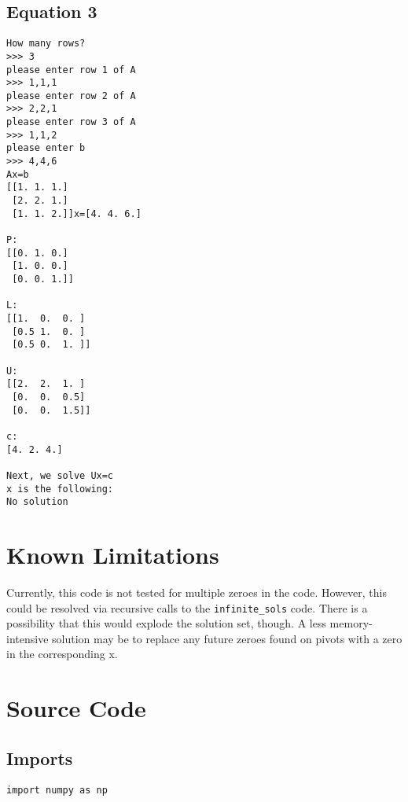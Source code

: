 \documentclass{article}
\begin{document}
\subsection{Equation 3}
\begin{verbatim}
How many rows?
>>> 3
please enter row 1 of A
>>> 1,1,1
please enter row 2 of A
>>> 2,2,1
please enter row 3 of A
>>> 1,1,2
please enter b
>>> 4,4,6
Ax=b
[[1. 1. 1.]
 [2. 2. 1.]
 [1. 1. 2.]]x=[4. 4. 6.]

P:
[[0. 1. 0.]
 [1. 0. 0.]
 [0. 0. 1.]]

L:
[[1.  0.  0. ]
 [0.5 1.  0. ]
 [0.5 0.  1. ]]

U:
[[2.  2.  1. ]
 [0.  0.  0.5]
 [0.  0.  1.5]]

c:
[4. 2. 4.]

Next, we solve Ux=c
x is the following:
No solution
\end{verbatim}

\section{Known Limitations}
Currently, this code is not tested for multiple zeroes in the code. However, this could be resolved via recursive calls to the \verb+infinite_sols+ code. There is a possibility that this would explode the solution set, though. A less memory-intensive solution may be to replace any future zeroes found on pivots with a zero in the corresponding x.

\pagebreak
\appendix
\appendixpage
\addappheadtotoc
\section {Source Code}
\subsection{Imports}
\begin{verbatim}
import numpy as np
\end{verbatim}
\end{document}
